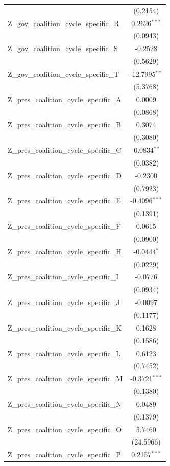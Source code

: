 \begin{tabular}{lc}
 & (0.2154) \\
Z\_gov\_coalition\_cycle\_specific\_R & 0.2626$^{***}$ \\
 & (0.0943) \\
Z\_gov\_coalition\_cycle\_specific\_S & -0.2528 \\
 & (0.5629) \\
Z\_gov\_coalition\_cycle\_specific\_T & -12.7995$^{**}$ \\
 & (5.3768) \\
Z\_pres\_coalition\_cycle\_specific\_A & 0.0009 \\
 & (0.0868) \\
Z\_pres\_coalition\_cycle\_specific\_B & 0.3074 \\
 & (0.3080) \\
Z\_pres\_coalition\_cycle\_specific\_C & -0.0834$^{**}$ \\
 & (0.0382) \\
Z\_pres\_coalition\_cycle\_specific\_D & -0.2300 \\
 & (0.7923) \\
Z\_pres\_coalition\_cycle\_specific\_E & -0.4096$^{***}$ \\
 & (0.1391) \\
Z\_pres\_coalition\_cycle\_specific\_F & 0.0615 \\
 & (0.0900) \\
Z\_pres\_coalition\_cycle\_specific\_H & -0.0444$^{*}$ \\
 & (0.0229) \\
Z\_pres\_coalition\_cycle\_specific\_I & -0.0776 \\
 & (0.0934) \\
Z\_pres\_coalition\_cycle\_specific\_J & -0.0097 \\
 & (0.1177) \\
Z\_pres\_coalition\_cycle\_specific\_K & 0.1628 \\
 & (0.1586) \\
Z\_pres\_coalition\_cycle\_specific\_L & 0.6123 \\
 & (0.7452) \\
Z\_pres\_coalition\_cycle\_specific\_M & -0.3721$^{***}$ \\
 & (0.1380) \\
Z\_pres\_coalition\_cycle\_specific\_N & 0.0489 \\
 & (0.1379) \\
Z\_pres\_coalition\_cycle\_specific\_O & 5.7460 \\
 & (24.5966) \\
Z\_pres\_coalition\_cycle\_specific\_P & 0.2157$^{***}$ \\

\end{tabular}
